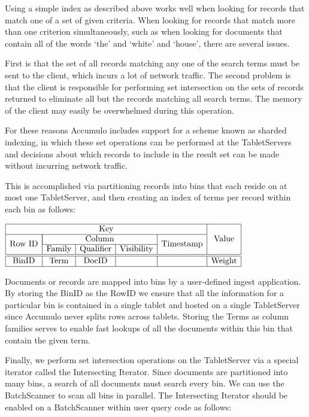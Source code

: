 Using a simple index as described above works well when looking for records that
match one of a set of given criteria. When looking for records that match more than
one criterion simultaneously, such as when looking for documents that contain all of
the words `the' and `white' and `house', there are several issues.

First is that the set of all records matching any one of the search terms must be sent
to the client, which incurs a lot of network traffic. The second problem is that the
client is responsible for performing set intersection on the sets of records returned
to eliminate all but the records matching all search terms. The memory of the client
may easily be overwhelmed during this operation.

For these reasons Accumulo includes support for a scheme known as sharded
indexing, in which these set operations can be performed at the TabletServers and
decisions about which records to include in the result set can be made without
incurring network traffic.

This is accomplished via partitioning records into bins that each reside on at most
one TabletServer, and then creating an index of terms per record within each bin as
follows:

\begin{center}
$\begin{array}{|c|c|c|c|c|c|} \hline
\multicolumn{5}{|c|}{\mbox{Key}} & \multirow{3}{*}{\mbox{Value}}\\ \cline{1-5}
\multirow{2}{*}{\mbox{Row ID}}& \multicolumn{3}{|c|}{\mbox{Column}} & \multirow{2}{*}{\mbox{Timestamp}} & \\ \cline{2-4}
& \mbox{Family} & \mbox{Qualifier} & \mbox{Visibility} & & \\ \hline \hline
\mbox{BinID} & \mbox{Term} & \mbox{DocID} & & & \mbox{Weight} \\ \hline
\end{array}$
\end{center}

Documents or records are mapped into bins by a user-defined ingest application. By
storing the BinID as the RowID we ensure that all the information for a particular
bin is contained in a single tablet and hosted on a single TabletServer since
Accumulo never splits rows across tablets. Storing the Terms as column families
serves to enable fast lookups of all the documents within this bin that contain the
given term.

Finally, we perform set intersection operations on the TabletServer via a special
iterator called the Intersecting Iterator. Since documents are partitioned into many
bins, a search of all documents must search every bin. We can use the BatchScanner
to scan all bins in parallel. The Intersecting Iterator should be enabled on a
BatchScanner within user query code as follows:

